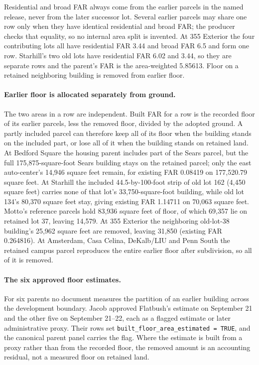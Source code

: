 Residential and broad FAR always come from the earlier parcels in the named
release, never from the later successor lot. Several earlier parcels may share
one row only when they have identical residential and broad FAR; the producer
checks that equality, so no internal area split is invented. At 355 Exterior
the four contributing lots all have residential FAR 3.44 and broad FAR 6.5 and
form one row. Starhill's two old lots have residential FAR 6.02 and 3.44, so
they are separate rows and the parent's FAR is the area-weighted 5.85613.
Floor on a retained neighboring building is removed from earlier floor.

\paragraph{Earlier floor is allocated separately from ground.}
The two areas in a row are independent. Built FAR for a row is the recorded
floor of its earlier parcels, less the removed floor, divided by the adopted
ground. A partly included parcel can therefore keep all of its floor when the
building stands on the included part, or lose all of it when the building
stands on retained land. At Bedford Square the housing parent includes part of
the Sears parcel, but the full 175,875-square-foot Sears building stays on
the retained parcel; only the east auto-center's 14,946 square feet remain,
for existing FAR 0.08419 on 177,520.79 square feet. At Starhill the included
44.5-by-100-foot strip of old lot 162 (4,450 square feet) carries none of
that lot's 33,750-square-foot building, while old lot 134's 80,370 square feet
stay, giving existing FAR 1.14711 on 70,063 square feet. Motto's reference
parcels hold 83,936 square feet of floor, of which 69,357 lie on retained lot
37, leaving 14,579. At 355 Exterior the neighboring old-lot-38 building's
25,962 square feet are removed, leaving 31,850 (existing FAR 0.264816). At
Amsterdam, Casa Celina, DeKalb/LIU and Penn South the retained campus parcel
reproduces the entire earlier floor after subdivision, so all of it is
removed.

\paragraph{The six approved floor estimates.}
For six parents no document measures the partition of an earlier building
across the development boundary. Jacob approved Flatbush's estimate on
September 21 and the other five on September 21--22, each as a flagged
estimate or later administrative proxy. Their rows set
\texttt{built\_floor\_area\_estimated = TRUE}, and the canonical parent panel
carries the flag. Where the estimate is built from a proxy rather than from the
recorded floor, the removed amount is an accounting residual, not a measured
floor on retained land.

